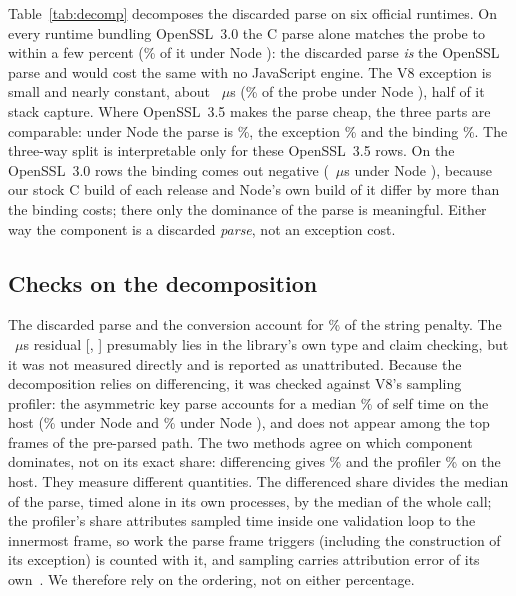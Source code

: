 \documentclass[preprint,12pt,authoryear]{elsarticle}
\begin{document}
Table~\ref{tab:decomp} decomposes the discarded parse on six official runtimes. On every
runtime bundling OpenSSL~3.0 the C parse alone matches the probe to within a
few percent (\RtEighteenDecompCPct\% of it under Node \RtEighteenLiteral): the
discarded parse \emph{is} the OpenSSL parse and would cost the same with no
JavaScript engine. The V8 exception is small and nearly constant, about
\RtEighteenExcNodeLike~$\mu$s (\RtEighteenDecompExcPct\% of the probe under Node
\RtEighteenLiteral), half of it stack capture. Where OpenSSL~3.5 makes the parse
cheap, the three parts are comparable: under Node \RtTwentySixLiteral{} the
parse is \RtTwentySixDecompCPct\%, the exception \RtTwentySixDecompExcPct\% and
the binding \RtTwentySixDecompLeftoverPct\%. The three-way split is
interpretable only for these OpenSSL~3.5 rows. On the OpenSSL~3.0 rows the
binding comes out negative (\RtEighteenDecompLeftover~$\mu$s under Node
\RtEighteenLiteral), because our stock C build of each release and Node's own
build of it differ by more than the binding costs; there only the dominance of
the parse is meaningful. Either way the component is a discarded
\emph{parse}, not an exception cost.

\subsection{Checks on the decomposition}\label{sec:residual}

The discarded parse and the conversion account for \DecompExplainedPct\% of the
string penalty. The \DecompResidual~$\mu$s residual [\DecompResidualCiLo,
\DecompResidualCiHi] presumably lies in the library's own type and claim
checking, but it was not measured directly and is reported as unattributed.
Because the decomposition relies on differencing, it was checked against V8's
sampling profiler: the asymmetric key parse accounts for a median
\ProfHostPct\% of self time on the host (\ProfEighteenPct\% under Node
\NodeEighteenNodeMajor{} and \ProfTwentySixPct\% under Node
\NodeTwentySixMuslNodeMajor), and does not appear among the top frames of the
pre-parsed path. The two methods agree on which component dominates, not on
its exact share: differencing gives \HostProbeShareOfCall\% and the profiler
\ProfHostPct\% on the host. They measure different quantities. The differenced
share divides the median of the parse, timed alone in its own processes, by
the median of the whole call; the profiler's share attributes sampled time
inside one validation loop to the innermost frame, so work the parse frame
triggers (including the construction of its exception) is counted with it, and
sampling carries attribution error of its own~\citep{mytkowicz2010profilers}.
We therefore rely on the ordering, not on either percentage.
\end{document}
